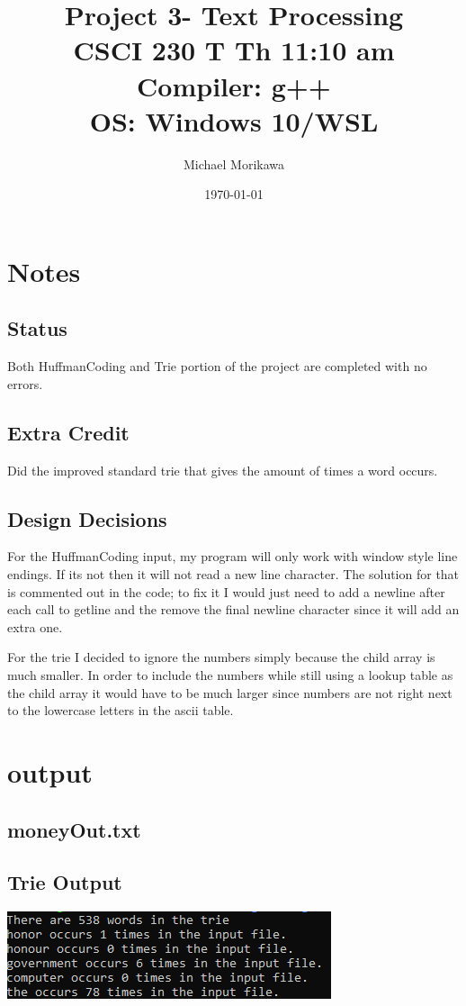 \documentclass[titlepage]{article}
\title{
    Project 3- Text Processing \\
    CSCI 230 T Th 11:10 am \\
    Compiler: g++ \\
    OS: Windows 10/WSL
    }
\author{Michael Morikawa}
\date{\today}
\begin{document}
\maketitle

\section{Notes}
\subsection{Status}
Both HuffmanCoding and Trie portion of the project are completed with no errors.
\subsection{Extra Credit}
Did the improved standard trie that gives the amount of times a word occurs.
\subsection{Design Decisions}
For the HuffmanCoding input, my program will only work with window style line endings. If
its not then it will not read a new line character. The solution for that is commented out in the code; to fix
it I would just need to add a newline after each call to getline and the remove the final newline character since it
will add an extra one.

For the trie I decided to ignore the numbers simply because the child array is much smaller. In order to include the numbers
while still using a lookup table as the child array it would have to be much larger since numbers are not right next to the lowercase letters in
the ascii table.


\newpage

\section{output}
\subsection{moneyOut.txt}

\subsection{Trie Output}
\includegraphics[]{trieOutput.png}
\end{document}
